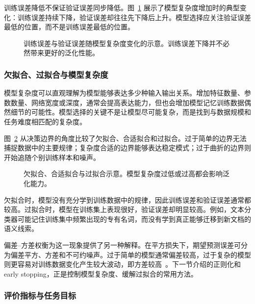 训练误差降低不保证验证误差同步降低。图~\ref{fig:aml-train-test-error} 展示了模型复杂度增加时的典型变化：训练误差持续下降，验证误差却往往先下降后上升。模型选择应关注验证误差最低的位置，而不是训练误差最低的位置。

\begin{figure}[htbp]
  \centering
  
  \caption{训练误差与验证误差随模型复杂度变化的示意。训练误差下降并不必然带来更好的泛化性能。}
  \label{fig:aml-train-test-error}
\end{figure}

\subsubsection{欠拟合、过拟合与模型复杂度}

模型复杂度可以直观理解为模型能够表达多少种输入输出关系。增加特征数量、参数数量、网络宽度或深度，通常会提高表达能力，但也会增加模型记忆训练数据偶然细节的可能性。模型选择的关键不是让模型尽可能复杂，而是找到与数据规模和任务难度相匹配的复杂度。

图~\ref{fig:nlpbook-underfitting-overfitting} 从决策边界的角度比较了欠拟合、合适拟合和过拟合。过于简单的边界无法捕捉数据中的主要规律；复杂度合适的边界能够表达稳定模式；过于曲折的边界则开始追随个别训练样本和噪声。


\begin{figure}[htbp]
  \centering
  
  \caption{欠拟合、合适拟合与过拟合示意。模型复杂度过低或过高都会影响泛化能力。}
  \label{fig:nlpbook-underfitting-overfitting}
\end{figure}

欠拟合时，模型没有充分学到训练数据中的规律，因此训练误差和验证误差通常都较高。过拟合时，模型在训练集上表现很好，验证误差却明显较高。例如，文本分类器可能记住训练集中频繁出现的专有名词，而没有学到真正能够迁移到新文档的语义线索。

偏差--方差权衡为这一现象提供了另一种解释。在平方损失下，期望预测误差可分为偏差平方、方差和不可约噪声。过于简单的模型通常偏差较高，过于复杂的模型则更容易对训练数据变化产生较大波动，即方差较高~\cite{GoodfellowEtAl2016DeepLearning}。下一节介绍的正则化和 early stopping，正是控制模型复杂度、缓解过拟合的常用方法。

\subsubsection{评价指标与任务目标}

